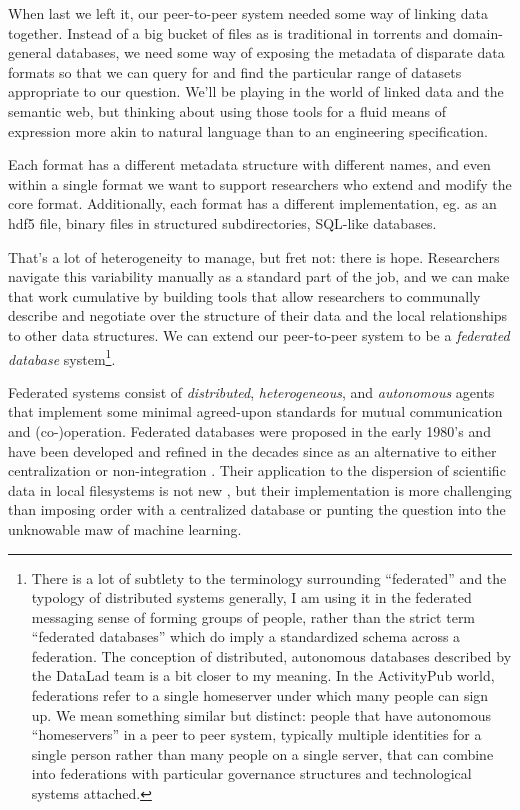 \documentclass[10pt]{article}
\begin{document}
\begin{multicols}{2}
 When last we left it, our peer-to-peer system needed some
way of linking data together. Instead of a big bucket of files as is
traditional in torrents and domain-general databases, we need some way
of exposing the metadata of disparate data formats so that we can query
for and find the particular range of datasets appropriate to our
question. We'll be playing in the world of linked data and the semantic
web, but thinking about using those tools for a fluid means of
expression more akin to natural language than to an engineering
specification.

Each format has a different metadata structure with different names, and
even within a single format we want to support researchers who extend
and modify the core format. Additionally, each format has a different
implementation, eg. as an hdf5 file, binary files in structured
subdirectories, SQL-like databases.

That's a lot of heterogeneity to manage, but fret not: there is hope.
Researchers navigate this variability manually as a standard part of the
job, and we can make that work cumulative by building tools that allow
researchers to communally describe and negotiate over the structure of
their data and the local relationships to other data structures. We can
extend our peer-to-peer system to be a \emph{federated database}
system\footnote{There is a lot of subtlety to the terminology
  surrounding ``federated'' and the typology of distributed systems
  generally, I am using it in the federated messaging sense of forming
  groups of people, rather than the strict term ``federated databases''
  which do imply a standardized schema across a federation. The
  conception of distributed, autonomous databases described by the
  DataLad team \cite{hankeDefenseDecentralizedResearch2021}  is a
  bit closer to my meaning. In the ActivityPub world, federations refer
  to a single homeserver under which many people can sign up. We mean
  something similar but distinct: people that have autonomous
  ``homeservers'' in a peer to peer system, typically multiple
  identities for a single person rather than many people on a single
  server, that can combine into federations with particular governance
  structures and technological systems attached.}.

Federated systems consist of \emph{distributed}, \emph{heterogeneous},
and \emph{autonomous} agents that implement some minimal agreed-upon
standards for mutual communication and (co-)operation. Federated
databases were proposed in the early 1980's \cite{heimbignerFederatedArchitectureInformation1985}  and have been
developed and refined in the decades since as an alternative to either
centralization or non-integration \cite{litwinInteroperabilityMultipleAutonomous1990, kashyapSemanticSchematicSimilarities1996, hullManagingSemanticHeterogeneity1997} . Their application to the
dispersion of scientific data in local filesystems is not new \cite{busseFederatedInformationSystems1999, djokic-petrovicPIBASFedSPARQLWebbased2017, hasnainBioFedFederatedQuery2017} , but their implementation is more
challenging than imposing order with a centralized database or punting
the question into the unknowable maw of machine learning.


\end{multicols}
\end{document}
